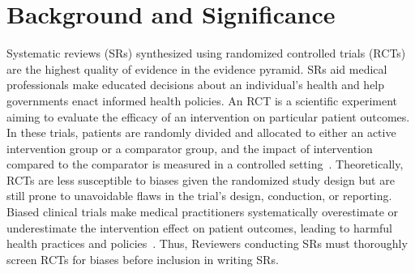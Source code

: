 \documentclass[sn-mathphys,Numbered]{sn-jnl}%
\theoremstyle{thmstyleone}%
\theoremstyle{thmstyletwo}%
\theoremstyle{thmstylethree}%
\begin{document}



\maketitle


\section{Background and Significance}
\label{sec:background}
%
Systematic reviews (SRs) synthesized using randomized controlled trials (RCTs) are the highest quality of evidence in the evidence pyramid.
SRs aid medical professionals make educated decisions about an individual's health and help governments enact informed health policies.
An RCT is a scientific experiment aiming to evaluate the efficacy of an intervention on particular patient outcomes.
In these trials, patients are randomly divided and allocated to either an active intervention group or a comparator group, and the impact of intervention compared to the comparator is measured in a controlled setting~\cite{sibbald1998understanding}.
Theoretically, RCTs are less susceptible to biases given the randomized study design but are still prone to unavoidable flaws in the trial's design, conduction, or reporting.
Biased clinical trials make medical practitioners systematically overestimate or underestimate the intervention effect on patient outcomes, leading to harmful health practices and policies~\cite{kjaergard1999randomized,naci2019design}.
Thus, Reviewers conducting SRs must thoroughly screen RCTs for biases before inclusion in writing SRs.
\end{document}

